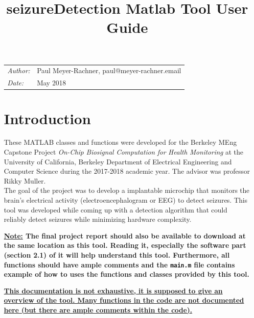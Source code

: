 \documentclass[usletter, 11pt]{extarticle}
\title{seizureDetection Matlab Tool User Guide}
\begin{document}

\setlength{\footskip}{20pt}
\setlength{\columnseprule}{0.2pt} 
\linespread{1.15}

\maketitle

\vspace{0.5cm}


\begin{mdframed}
\begin{tabular}{ll}
	\emph{Author:} & Paul Meyer-Rachner, paul@meyer-rachner.email \\
	\emph{Date:} & May 2018
\end{tabular}
\end{mdframed}

\tableofcontents

\newpage
\section{Introduction}

These MATLAB classes and functions were developed for the Berkeley MEng Capstone Project \emph{On-Chip Biosignal Computation for Health Monitoring} at the University of California, Berkeley Department of Electrical Engineering and Computer Science during the 2017-2018 academic year. The advisor was professor Rikky Muller. \\

The goal of the project was to develop a implantable microchip that monitors the brain's electrical activity (electroencephalogram or EEG) to detect seizures. This tool was developed while coming up with a detection algorithm that could reliably detect seizures while minimizing hardware complexity. \\

\begin{mdframed}
\textbf{\underline{Note:} The final project report should also be available to download at the same location as this tool. Reading it, especially the software part (section 2.1) of it will help understand this tool. Furthermore, all functions should have ample comments and the \texttt{main.m} file contains example of how to uses the functions and classes provided by this tool.}

\textbf{\ul{This documentation is not exhaustive, it is supposed to give an overview of the tool. Many functions in the code are not documented here (but there are ample comments within the code).}}
\end{mdframed}
\end{document}
